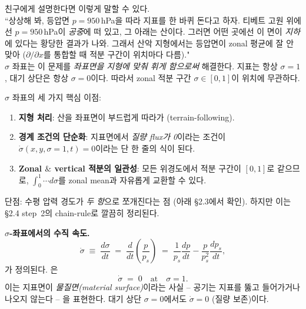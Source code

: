 
\begin{remark}\label{rem:ch07_cons_why_sigma}
친구에게 설명한다면 이렇게 말할 수 있다.\\
``상상해 봐, 등압면 $p = 950$\,hPa을 따라 지표를 한 바퀴 돈다고 하자.  티베트
고원 위에선 $p = 950$\,hPa이 \emph{공중}에 떠 있고, 그 아래는 산이다.  그러면
어떤 곳에선 이 면이 \emph{지하}에 있다는 황당한 결과가 나와.  그래서 산악
지형에서는 등압면이 zonal 평균에 잘 안 맞아 ($\partial/\partial x$를 통합할
때 적분 구간이 위치마다 다름)."\\
$\sigma$ 좌표는 이 문제를 \emph{좌표면을 지형에 맞춰 휘게 함으로써} 해결한다.
지표는 항상 $\sigma=1$, 대기 상단은 항상 $\sigma=0$이다.  따라서 zonal 적분
구간 $\sigma \in [0,1]$이 위치에 무관하다.
\end{remark}

\begin{hisublock}
$\sigma$ 좌표의 세 가지 핵심 이점:
\begin{enumerate}
  \item \textbf{지형 처리}: 산을 좌표면이 부드럽게 따라가 (terrain-following).
  \item \textbf{경계 조건의 단순화}: 지표면에서 \emph{질량 flux가 0}이라는
        조건이 $\dot\sigma(x,y,\sigma=1,t) = 0$이라는 단 한 줄의 식이 된다.
  \item \textbf{Zonal $\&$ vertical 적분의 일관성}: 모든 위경도에서 적분 구간이
        $[0,1]$로 같으므로, $\int_0^1 \cdots d\sigma$를 zonal mean과 자유롭게
        교환할 수 있다.
\end{enumerate}
단점: 수평 압력 경도가 \emph{두 항}으로 쪼개진다는 점 (아래 \S2.3에서 확인).
하지만 이는 \S2.4 step~2의 chain-rule로 깔끔히 정리된다.
\end{hisublock}

\medskip



\noindent\textbf{$\sigma$-좌표에서의 수직 속도.}
\[
  \dot\sigma \;\equiv\; \frac{d\sigma}{dt}
  \;=\; \frac{d}{dt}\!\left(\frac{p}{p_s}\right)
  \;=\; \frac{1}{p_s}\frac{dp}{dt} - \frac{p}{p_s^2}\frac{dp_s}{dt},
\]
가 정의된다.  은
\begin{equation}\label{eq:ch07_cons_sigma_bc}
  \boxed{\;\dot\sigma \;=\; 0\quad\text{at}\quad \sigma = 1.\;}
\end{equation}
이는 지표면이 \emph{물질면(material surface)}이라는 사실 -- 공기는 지표를 뚫고
들어가거나 나오지 않는다 -- 을 표현한다.  대기 상단 $\sigma=0$에서도
$\dot\sigma=0$ (질량 보존)이다.

